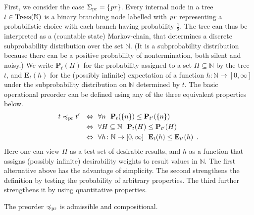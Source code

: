 First, we  consider the case $\Sigma_{\text{pr}} = \{\operatorname{\mathit{pr}}\}$. Every internal node in a  tree $t \in \textnormal{Trees}(\mathbb{N})$  is a binary branching node labelled with $\operatorname{\mathit{pr}}$ representing a probabilistic choice with each branch having probability $\frac{1}{2}$. The tree can thus be interpreted as a (countable state) Markov-chain, that determines a discrete subprobability distribution over the set $\mathbb{N}$.
(It is a subprobability distribution because there can be a positive probability of nontermination, both silent and noisy.) We write
$\mathbf{P}_t (H)$ for the probability assigned to a set $H \subseteq \mathbb{N}$
by the tree $t$, and $\mathbf{E}_t (h)$ for the (possibly infinite) expectation of a function $h\colon \mathbb{N} \to [0,\infty]$ under the subprobability distribution on $\mathbb{N}$ determined by $t$.
The basic operational preorder can be defined using any of the three equivalent properties below.
\begin{align*}
t \preccurlyeq_{\text{pr}} t' ~~ \Leftrightarrow ~~ &  \forall n ~ ~ \mathbf{P}_t (\{n\}) \leq \mathbf{P}_{t'}(\{n\})  \\
 ~ \Leftrightarrow ~~ & \forall H \subseteq \mathbb{N} ~~ \mathbf{P}_t (H) \leq \mathbf{P}_{t'}(H) \\
 ~ \Leftrightarrow ~~ & \forall h\colon \mathbb{N} \to [0,\infty] ~~ \mathbf{E}_t (h) \leq \mathbf{E}_{t'}(h) \enspace .
\end{align*}
Here one can view $H$ as a test set of desirable results, and $h$ as a function that assigns (possibly infinite) desirability weights 
to result values in $\mathbb{N}$. The first alternative above has the advantage of simplicity. The second strengthens the definition by testing the probability of arbitrary properties. The third further strengthens it by using quantitative properties.
\begin{aproposition}
The preorder $\preccurlyeq_{\text{pr}}$ is admissible and compositional. 
\end{aproposition}

